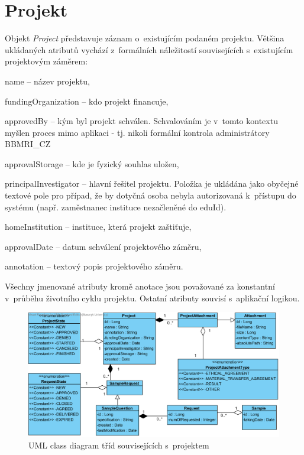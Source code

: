 \documentclass[11pt, draft, oneside]{fithesis2}
\newcommand{\ProjectName}{\mbox{BBMRI\_CZ}\xspace}
\begin{document}
\section{Projekt}
Objekt \textit{Project} představuje záznam o~existujícím podaném projektu. Většina ukládaných atributů vychází z~formálních náležitostí souvisejících s~existujícím projektovým záměrem:
\begin{compactitem}
	\item name -- název projektu,
	\item fundingOrganization -- kdo projekt financuje,	
	\item approvedBy -- kým byl projekt schválen. Schvalováním je v~tomto kontextu myšlen proces mimo aplikaci - tj. nikoli formální kontrola administrátory \ProjectName
	\item approvalStorage -- kde je fyzický souhlas uložen,
	\item principalInvestigator -- hlavní řešitel projektu. Položka je ukládána jako obyčejné textové pole pro případ, že by dotyčná osoba nebyla autorizovaná k~přístupu do systému (např. zaměstnanec instituce nezačleněné do eduId).
	\item homeInstitution -- instituce, která projekt zaštiťuje,
	\item approvalDate -- datum schválení projektového záměru,
	\item annotation -- textový popis projektového záměru.
\end{compactitem}
Všechny jmenované atributy kromě anotace jsou považované za konstantní v~průběhu životního cyklu projektu. Ostatní atributy souvisí s~aplikační logikou. 

\begin{figure}[h!]
\begin{center}
	\includegraphics[width=\textwidth]{ProjectView}
\caption{UML class diagram tříd souvisejících s~projektem}
\label{fig:index:uml:class:project}
\end{center}
\end{figure}
\end{document}
